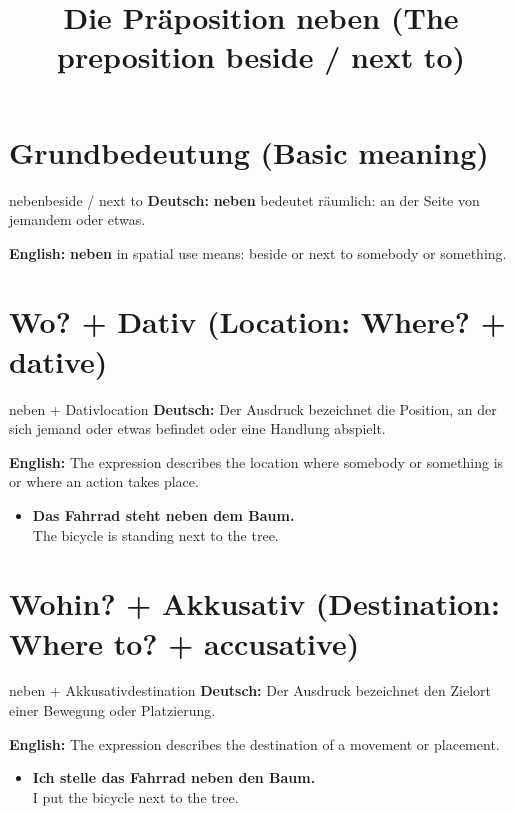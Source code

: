 \documentclass[a4paper,11pt]{article}
\title{Die Präposition neben (The preposition beside / next to)}
\date{}
\newcommand{\GermanText}[1]{\textbf{Deutsch: }#1\par}
\newcommand{\EnglishText}[1]{{\small\color{SoftGray}\textbf{English: }#1\par}}
\newcommand{\ExampleItem}[2]{\item \textbf{#1}\\{\small\color{SoftGray}#2}}
\begin{document}
\maketitle
\tableofcontents
\newpage
\section{Grundbedeutung (Basic meaning)}
\begin{grammarentry}{neben}{beside / next to}
\GermanText{\textbf{neben} bedeutet räumlich: an der Seite von jemandem oder etwas.}
\EnglishText{\textbf{neben} in spatial use means: beside or next to somebody or something.}
\end{grammarentry}
\section{Wo? + Dativ (Location: Where? + dative)}
\begin{grammarentry}{neben + Dativ}{location}
\GermanText{Der Ausdruck bezeichnet die Position, an der sich jemand oder etwas befindet oder eine Handlung abspielt.}
\EnglishText{The expression describes the location where somebody or something is or where an action takes place.}
\end{grammarentry}
\begin{exbox}
\begin{itemize}
\ExampleItem{Das Fahrrad steht neben dem Baum.}{The bicycle is standing next to the tree.}
\end{itemize}
\end{exbox}
\section{Wohin? + Akkusativ (Destination: Where to? + accusative)}
\begin{grammarentry}{neben + Akkusativ}{destination}
\GermanText{Der Ausdruck bezeichnet den Zielort einer Bewegung oder Platzierung.}
\EnglishText{The expression describes the destination of a movement or placement.}
\end{grammarentry}
\begin{exbox}
\begin{itemize}
\ExampleItem{Ich stelle das Fahrrad neben den Baum.}{I put the bicycle next to the tree.}
\end{itemize}
\end{exbox}
\end{document}
